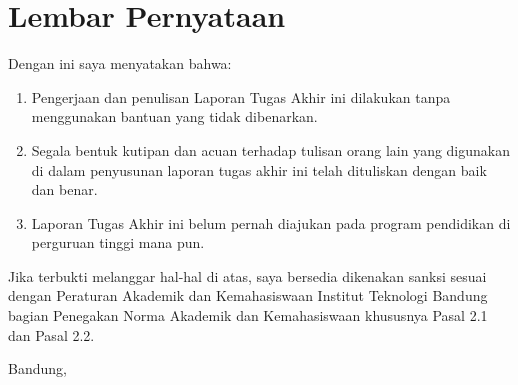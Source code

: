 \clearpage
\pagestyle{empty}
\chapter*{Lembar Pernyataan}
\thispagestyle{empty}

Dengan ini saya menyatakan bahwa:

\begin{enumerate}

	\item Pengerjaan dan penulisan Laporan Tugas Akhir ini dilakukan tanpa menggunakan bantuan yang tidak dibenarkan.
	\item Segala bentuk kutipan dan acuan terhadap tulisan orang lain yang digunakan di dalam penyusunan laporan tugas akhir ini telah dituliskan dengan baik dan benar.
	\item Laporan Tugas Akhir ini belum pernah diajukan pada program pendidikan di perguruan tinggi mana pun.

\end{enumerate}

Jika terbukti melanggar hal-hal di atas, saya bersedia dikenakan sanksi sesuai dengan Peraturan Akademik dan Kemahasiswaan Institut Teknologi Bandung bagian Penegakan Norma Akademik dan Kemahasiswaan khususnya Pasal 2.1 dan Pasal 2.2.
\vspace{15mm}

Bandung, \tanggalpengesahan

\vspace{0.5cm}
\vspace{1.5cm}
\theauthor
